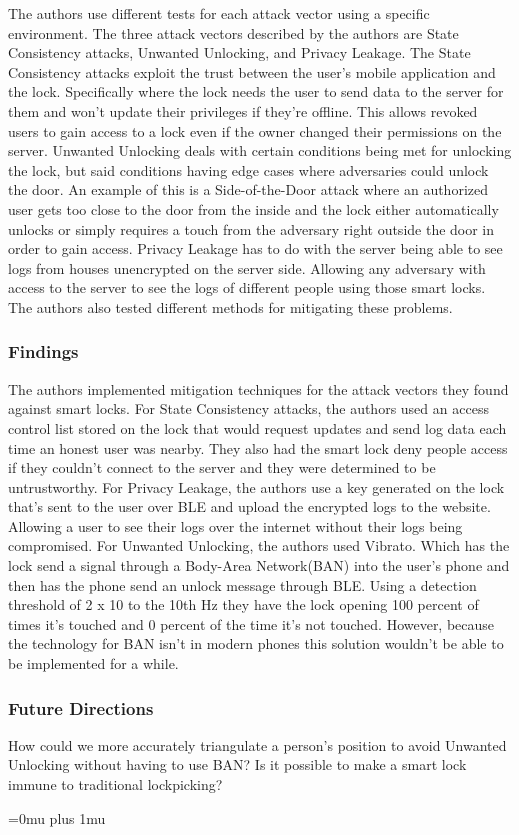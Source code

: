 \noindent
The authors use different tests for each attack vector using a specific environment. The three attack vectors described by the authors are State Consistency attacks, Unwanted Unlocking, and Privacy Leakage. The State Consistency attacks exploit the trust between the user’s mobile application and the lock. Specifically where the lock needs the user to send data to the server for them and won’t update their privileges if they’re offline. This allows revoked users to gain access to a lock even if the owner changed their permissions on the server. Unwanted Unlocking deals with certain conditions being met for unlocking the lock, but said conditions having edge cases where adversaries could unlock the door. An example of this is a Side-of-the-Door attack where an authorized user gets too close to the door from the inside and the lock either automatically unlocks or simply requires a touch from the adversary right outside the door in order to gain access. Privacy Leakage has to do with the server being able to see logs from houses unencrypted on the server side. Allowing any adversary with access to the server to see the logs of different people using those smart locks. The authors also tested different methods for mitigating these problems.



\subsubsection{Findings}

\noindent
The authors implemented mitigation techniques for the attack vectors they found against smart locks. For State Consistency attacks, the authors used an access control list stored on the lock that would request updates and send log data each time an honest user was nearby. They also had the smart lock deny people access if they couldn’t connect to the server and they were determined to be untrustworthy. For Privacy Leakage, the authors use a key generated on the lock that’s sent to the user over BLE and upload the encrypted logs to the website. Allowing a user to see their logs over the internet without their logs being compromised. For Unwanted Unlocking, the authors used Vibrato. Which has the lock send a signal through a Body-Area Network(BAN) into the user’s phone and then has the phone send an unlock message through BLE. Using a detection threshold of 2 x 10 to the 10th Hz they have the lock opening 100 percent of times it’s touched and 0 percent of the time it’s not touched. However, because the technology for BAN isn’t in modern phones this solution wouldn’t be able to be implemented for a while.

\subsubsection{Future Directions}

\noindent
How could we more accurately triangulate a person's position to avoid Unwanted Unlocking without having to use BAN? Is it possible to make a smart lock immune to traditional lockpicking?

\Urlmuskip=0mu plus 1mu\relax

\pagebreak